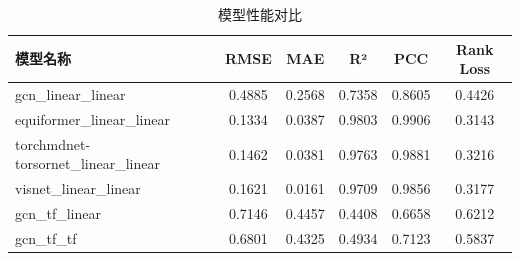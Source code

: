 \begin{table}[htbp]
\centering
\caption{模型性能对比}
\label{tab:model_performance}
\begin{tabular}{lccccc}
\hline
\textbf{模型名称} & \textbf{RMSE} & \textbf{MAE} & \textbf{R²} & \textbf{PCC} & \textbf{Rank Loss} \\
\hline
gcn\_linear\_linear & 0.4885 & 0.2568 & 0.7358 & 0.8605 & 0.4426 \\
equiformer\_linear\_linear & 0.1334 & 0.0387 & 0.9803 & 0.9906 & 0.3143 \\
torchmdnet-torsornet\_linear\_linear & 0.1462 & 0.0381 & 0.9763 & 0.9881 & 0.3216 \\
visnet\_linear\_linear & 0.1621 & 0.0161 & 0.9709 & 0.9856 & 0.3177 \\
gcn\_tf\_linear & 0.7146 & 0.4457 & 0.4408 & 0.6658 & 0.6212 \\
gcn\_tf\_tf & 0.6801 & 0.4325 & 0.4934 & 0.7123 & 0.5837 \\
\hline
\end{tabular}
\end{table}